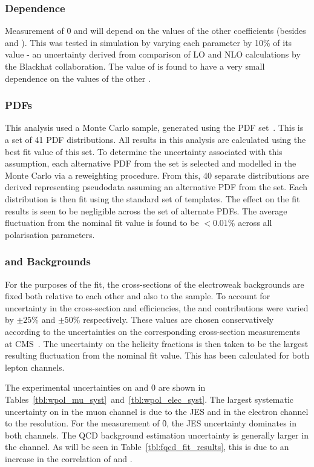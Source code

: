 \subsubsection{\Ai Dependence}
Measurement of \f0 and \fLmfR will depend on the values of the other \Ai
coefficients (besides \Azero and \Afour). This was tested in simulation by
varying each parameter \Ai by 10\% of its value - an uncertainty derived from
comparison of \ac{LO} and \ac{NLO} calculations by the Blackhat
collaboration. The value of \fLmfR is found to have a very small dependence on
the values of the other \Ai.

\subsubsection{\aclp{PDF}}
\label{sec:wpol_syst_pdf}
This analysis used a \Wjets Monte Carlo sample, generated using the \cteqsixlone
\ac{PDF} set~\cite{cteq6l1}. This is a set of 41 \ac{PDF} distributions. All
results in this analysis are calculated using the best fit value of this set. To
determine the uncertainty associated with this assumption, each alternative
\ac{PDF} from the set is selected and modelled in the Monte Carlo via a
reweighting procedure. From this, 40 separate \LP distributions are derived
representing pseudodata assuming an alternative \ac{PDF} from the set. Each
distribution is then fit using the standard set of templates. The effect on the
fit results is seen to be negligible across the set of alternate \acp{PDF}. The
average fluctuation from the nominal fit value is found to be $< 0.01\%$ across
all polarisation parameters.

\subsubsection{\Zjets and \ttbar Backgrounds}
For the purposes of the fit, the cross-sections of the electroweak backgrounds
are fixed both relative to each other and also to the \Wjets sample. To account
for uncertainty in the cross-section and efficiencies, the \Zjets and \ttbar
contributions were varied by $\pm 25\%$ and $\pm 50\%$ respectively. These
values are chosen conservatively according to the uncertainties on the
corresponding cross-section measurements at
\ac{CMS}~\cite{cms_wz_pas,cms_ttbar_paper}. The uncertainty on the helicity
fractions is then taken to be the largest resulting fluctuation from the nominal
fit value. This has been calculated for both lepton channels.

The experimental uncertainties on \fLmfR and \f0 are shown in
Tables~\ref{tbl:wpol_mu_syst}~and~\ref{tbl:wpol_elec_syst}. The largest
systematic uncertainty on \fLmfR in the muon channel is due to the \ac{JES} and
in the electron channel to the \MET resolution. For the measurement of \f0, the
\ac{JES} uncertainty dominates in both channels. The \ac{QCD} background
estimation uncertainty is generally larger in the \PWm channel. As will be seen
in Table~\ref{tbl:fqcd_fit_results}, this is due to an increase in the
correlation of \fLmfR and \fQCD.

